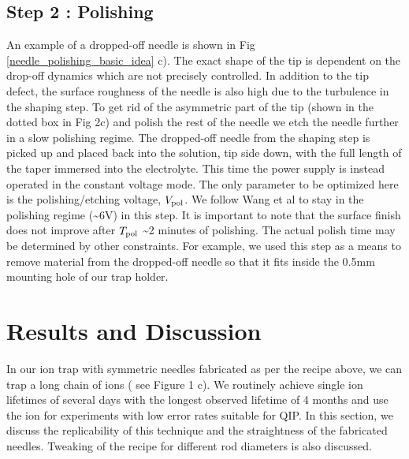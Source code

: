 \documentclass[%
 aip,
 amsmath,amssymb,
 reprint,%
]{revtex4-1}
\begin{document}
\subsection{Step 2 : Polishing }
An example of a dropped-off needle is shown in Fig \ref{needle_polishing_basic_idea} c).
The exact shape of the tip is dependent on the drop-off dynamics which are not precisely controlled.
In addition to the tip defect, the surface roughness of the needle is also high due to the turbulence in the shaping step.
To get rid of the asymmetric part of the tip (shown in the dotted box in Fig 2c) and polish the rest of the needle we etch the needle further in a slow polishing regime.
The dropped-off needle from the shaping step is picked up and placed back into the solution, tip side down, with the full length of the taper immersed into the electrolyte.  
This time the power supply is instead operated in the constant voltage mode. 
The only parameter to be optimized here is the polishing/etching voltage, $V_{\rm{pol}}$. 
We follow Wang et al \cite{Wang2016} to stay in the polishing regime (\textasciitilde6V) in this step.
It is important to note that the surface finish does not improve after $T_{\rm{pol}}$ \textasciitilde2 minutes of polishing. 
The actual polish time may be determined by other constraints. 
For example, we used this step as a means to remove material from the dropped-off needle so that it fits inside the 0.5mm mounting hole of our trap holder.


\section{\label{sec:level1 Results and Discussion}Results and Discussion}
In our ion trap with symmetric needles fabricated as per the recipe above, we can trap a long chain of ions ( see Figure 1 c).
We routinely achieve single ion lifetimes of several days with the longest observed lifetime of 4 months and use the ion for experiments with low error rates suitable for QIP\cite{Shih2021}.
In this section, we discuss the replicability of this technique and the straightness of the fabricated needles.
Tweaking of the recipe for different rod diameters is also discussed. 
\end{document}
